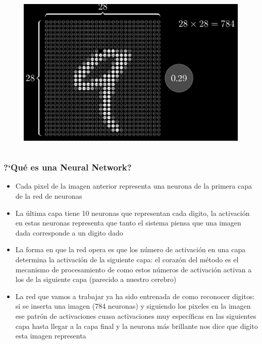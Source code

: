 \documentclass[10pt]{beamer}
\begin{document}
\begin{frame}
\begin{columns}
\begin{column}{.5\textwidth}
\vspace{-3.5mm}
\vspace{-3.5mm}
 \begin{figure}
  \includegraphics[scale=0.155]{./Figures/neurona_number.png}
 \end{figure}  
\end{column}%

\end{columns}

\end{frame}



\begin{frame}
\frametitle{?`Qu\'e es una Neural Network?}
\begin{beamerboxesrounded}[upper=uppercolor, lower=lowercolor, shadow=true]{} 

\begin{itemize}
\item Cada pixel de la imagen anterior representa una neurona de la primera capa de la red de neuronas

\item La \'ultima capa tiene 10 neuronas que representan cada digito, la activaci\'on en estas neuronas representa que tanto el sistema piensa que una imagen dada corresponde a un digito dado

\item La forma en que la red opera es que los n\'umero de activaci\'on en una capa determina la activaci\'on de la siguiente capa: el coraz\'on del m\'etodo es el mecanismo de procesamiento de como estos n\'umeros de activaci\'on activan a los de la siguiente capa (parecido a nuestro cerebro)

\item La red que vamos a trabajar ya ha sido entrenada de como reconocer digitos: si se inserta una imagen (784 neuronas) y siguiendo los pixeles en la imagen ese patr\'on de activaciones cuasa activaciones muy espec\'ificas en las siguientes capa hasta llegar a la capa final y la neurona m\'as brillante nos dice que digito esta imagen representa  

 
\end{itemize}
\end{beamerboxesrounded}

\end{frame}
\end{document}
